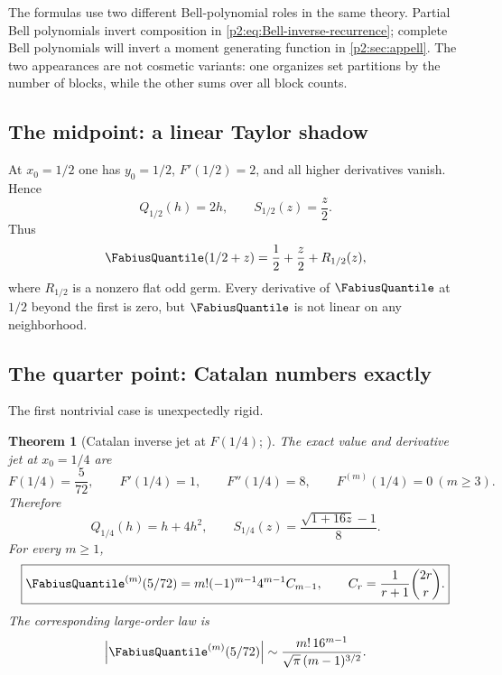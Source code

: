 \documentclass[11pt,oneside]{article}
\numberwithin{equation}{section}
\newtheorem{theorem}{Theorem}[section]
\theoremstyle{definition}
\theoremstyle{remark}
\begin{document}
\begin{remark}
The formulas use two different Bell-polynomial roles in the same theory.  Partial Bell polynomials
invert composition in \eqref{p2:eq:Bell-inverse-recurrence}; complete Bell polynomials will invert a
moment generating function in \cref{p2:sec:appell}.  The two appearances are not cosmetic variants:
one organizes set partitions by the number of blocks, while the other sums over all block counts.
\end{remark}

\subsection{The midpoint: a linear Taylor shadow}

At $x_0=1/2$ one has $y_0=1/2$, $F'(1/2)=2$, and all higher derivatives vanish.  Hence
\begin{equation}
 Q_{1/2}(h)=2h,
 \qquad
 S_{1/2}(z)=\frac z2.
 \label{p2:eq:midpoint-shadow}
\end{equation}
Thus
\begin{equation}
 \FabiusQuantile(1/2+z)=\frac12+\frac z2+R_{1/2}(z),
 \label{p2:eq:midpoint-flat}
\end{equation}
where $R_{1/2}$ is a nonzero flat odd germ.  Every derivative of $\FabiusQuantile$ at $1/2$ beyond the first is
zero, but $\FabiusQuantile$ is not linear on any neighborhood.

\subsection{The quarter point: Catalan numbers exactly}

The first nontrivial case is unexpectedly rigid.

\begin{theorem}[Catalan inverse jet at $F(1/4)$; \statusnew]
\label{p2:thm:Catalan-quarter}
The exact value and derivative jet at $x_0=1/4$ are
\begin{equation}
 F(1/4)=\frac5{72},
 \qquad F'(1/4)=1,
 \qquad F''(1/4)=8,
 \qquad F^{(m)}(1/4)=0\ (m\ge3).
 \label{p2:eq:quarter-jet}
\end{equation}
Therefore
\begin{equation}
 Q_{1/4}(h)=h+4h^2,
 \qquad
 S_{1/4}(z)=\frac{\sqrt{1+16z}-1}{8}.
 \label{p2:eq:quarter-shadow}
\end{equation}
For every $m\ge1$,
\begin{equation}
 \boxed{
 \FabiusQuantile^{(m)}(5/72)
 =m!(-1)^{m-1}4^{m-1}C_{m-1},
 \qquad C_r=\frac1{r+1}\binom{2r}{r}.
 }
 \label{p2:eq:Catalan-derivatives}
\end{equation}
The corresponding large-order law is
\begin{equation}
 \left|\FabiusQuantile^{(m)}(5/72)\right|
 \sim \frac{m!\,16^{m-1}}{\sqrt\pi\,(m-1)^{3/2}}.
 \label{p2:eq:Catalan-asymptotic}
\end{equation}
\end{theorem}
\end{document}
